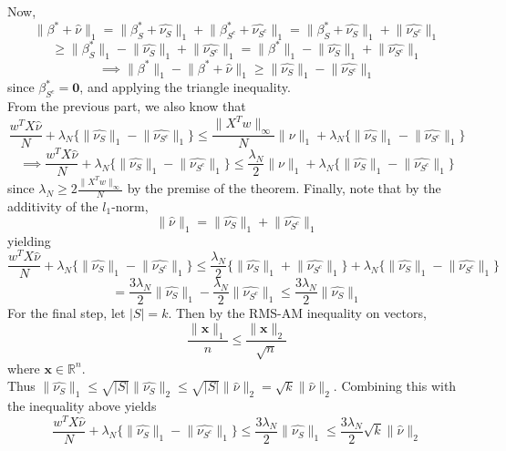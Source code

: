 \documentclass[a4paper,11pt]{article}
\numberwithin{definition}{section}
\numberwithin{mytheorem}{subsection}
\begin{document}
Now, 
$$\lVert \beta^* + \widehat{\nu}\rVert_1 = \lVert \beta_S^* + \widehat{\nu_S}\rVert_1 + \lVert \beta_{S^c}^* + \widehat{\nu_{S^c}}\rVert_1 = \lVert \beta_S^* + \widehat{\nu_S}\rVert_1 + \lVert \widehat{\nu_{S^c}}\rVert_1$$
$$\geq \lVert \beta_S^*\rVert_1 -\lVert \widehat{\nu_S}\rVert_1 + \lVert \widehat{\nu_{S^c}}\rVert_1 =  \lVert \beta^*\rVert_1 -\lVert \widehat{\nu_S}\rVert_1 + \lVert \widehat{\nu_{S^c}}\rVert_1$$
$$\implies \lVert\beta^{*}\rVert_1 - \lVert\beta^* + \widehat{\nu}\rVert_1 \geq \lVert \widehat{\nu_S}\rVert_1 - \lVert \widehat{\nu_{S^c}}\rVert_1$$
since $\beta_{S^c}^* = \mathbf{0}$, and applying the triangle inequality.\\
From the previous part, we also know that 
$$\frac{w^TX\widehat{\nu}}{N} + \lambda_N\{\lVert\widehat{\nu_S}\rVert_1 - \lVert\widehat{\nu_{S^c}}\rVert_1\}\leq \frac{\lVert X^Tw\rVert_{\infty}}{N}\lVert \nu\rVert_1 + \lambda_N\{\lVert\widehat{\nu_S}\rVert_1 - \lVert\widehat{\nu_{S^c}}\rVert_1\}$$
$$\implies\frac{w^TX\widehat{\nu}}{N} + \lambda_N\{\lVert\widehat{\nu_S}\rVert_1 - \lVert\widehat{\nu_{S^c}}\rVert_1\}\leq \frac{\lambda_N}{2}\lVert \nu\rVert_1 + \lambda_N\{\lVert\widehat{\nu_S}\rVert_1 - \lVert\widehat{\nu_{S^c}}\rVert_1\}$$
since $\lambda_N \geq 2\frac{\lVert X^Tw\rVert_{\infty}}{N}$ by the premise of the theorem. Finally, note that by the additivity of the $l_1$-norm, 
$$\lVert\widehat{\nu}\rVert_1 = \lVert\widehat{\nu_S}\rVert_1 + \lVert\widehat{\nu_{S^c}}\rVert_1$$
yielding
$$\frac{w^TX\widehat{\nu}}{N} + \lambda_N\{\lVert\widehat{\nu_S}\rVert_1 - \lVert\widehat{\nu_{S^c}}\rVert_1\}\leq \frac{\lambda_N}{2}\{\lVert\widehat{\nu_S}\rVert_1 + \lVert\widehat{\nu_{S^c}}\rVert_1\} + \lambda_N\{\lVert\widehat{\nu_S}\rVert_1 - \lVert\widehat{\nu_{S^c}}\rVert_1\}$$
$$ = \frac{3\lambda_N}{2}\lVert\widehat{\nu_S}\rVert_1 - \frac{\lambda_N}{2}\lVert\widehat{\nu_{S^c}}\rVert_1 \leq \frac{3\lambda_N}{2}\lVert\widehat{\nu_S}\rVert_1$$
For the final step, let $|S| = k$. Then by the RMS-AM inequality on vectors,
$$\frac{\lVert\boldsymbol{x}\rVert_1}{n}\leq\frac{\lVert\boldsymbol{x}\rVert_2}{\sqrt{n}}$$
where $\boldsymbol{x}\in\mathbb{R}^n$.\\
Thus $\lVert\widehat{\nu_S}\rVert_1 \leq \sqrt{|S|}\lVert\widehat{\nu_S}\rVert_2 \leq \sqrt{|S|}\lVert\widehat{\nu}\rVert_2 = \sqrt{k}\lVert\widehat{\nu}\rVert_2$. Combining this with the inequality above yields
$$\frac{w^TX\widehat{\nu}}{N} + \lambda_N\{\lVert\widehat{\nu_S}\rVert_1 - \lVert\widehat{\nu_{S^c}}\rVert_1\} \leq \frac{3\lambda_N}{2}\lVert\widehat{\nu_S}\rVert_1 \leq \frac{3\lambda_N}{2}\sqrt{k}\lVert\widehat{\nu}\rVert_2$$
\end{document}
